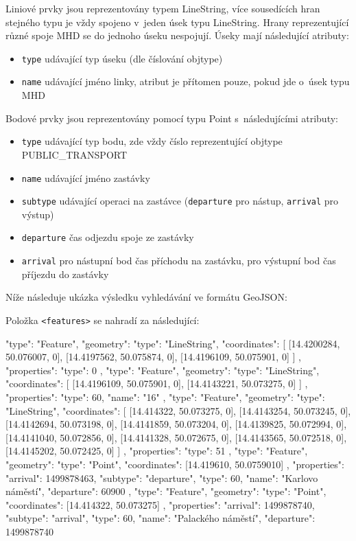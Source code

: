Liniové prvky jsou reprezentovány typem LineString, více sousedících hran
stejného typu je vždy spojeno v~jeden úsek typu LineString. Hrany reprezentující různé
spoje MHD se do jednoho úseku nespojují. Úseky mají následující atributy: 
\begin{itemize}
	\item {\tt type} udávající typ úseku (dle číslování objtype)
	\item {\tt name} udávající jméno linky, atribut je přítomen pouze, pokud
	jde o~úsek typu MHD
\end{itemize}
Bodové prvky jsou reprezentovány pomocí typu Point s~následujícími atributy: 
\begin{itemize}
	\item {\tt type} udávající typ bodu, zde vždy číslo reprezentující objtype PUBLIC\_TRANSPORT  	
	\item {\tt name} udávající jméno zastávky
	\item {\tt subtype} udávající operaci na zastávce ({\tt departure} pro
	nástup, {\tt arrival} pro výstup)
	\item {\tt departure} čas odjezdu spoje ze zastávky
	\item {\tt arrival} pro nástupní bod čas příchodu na zastávku, pro
	výstupní bod čas příjezdu do zastávky
\end{itemize}
Níže následuje ukázka výsledku vyhledávání ve formátu GeoJSON:
\begin{code}
\end{code}

Položka {\tt <features>} se nahradí za následující:
\begin{code}
{
	"type": "Feature",
	"geometry":
	{
		"type": "LineString",
		"coordinates":
		[
			[14.4200284, 50.076007, 0], 
			[14.4197562, 50.075874, 0], 
			[14.4196109, 50.075901, 0]
		]
	}, 
	"properties": {"type": 0}
}, 
{
	"type": "Feature",
	"geometry": 
	{
		"type": "LineString",
		"coordinates":
		[
			[14.4196109, 50.075901, 0],
			[14.4143221, 50.073275, 0]
		]
	},
	"properties": {"type": 60, "name": "16"}
}, {
	"type": "Feature",
	"geometry": 
	{
		"type": "LineString",
		"coordinates":
		[
			[14.414322, 50.073275, 0],
			[14.4143254, 50.073245, 0],
			[14.4142694, 50.073198, 0],
			[14.4141859, 50.073204, 0],
			[14.4139825, 50.072994, 0],
			[14.4141040, 50.072856, 0],
			[14.4141328, 50.072675, 0],
			[14.4143565, 50.072518, 0],
			[14.4145202, 50.072425, 0]
		]
	},
	"properties": {"type": 51}
}, {
	"type": "Feature",
	"geometry":
	{
		"type": "Point", 
		"coordinates": [14.419610, 50.0759010]
	},
	"properties": 
	{
		"arrival": 1499878463, 
		"subtype": "departure", 
		"type": 60, 
		"name": "Karlovo náměstí",
		"departure": 60900
	}
}, {
	"type": "Feature",
	"geometry":
	{
		"type": "Point",
		"coordinates": [14.414322, 50.073275]
	},
	"properties": 
	{
		"arrival": 1499878740,
		"subtype": "arrival",
		"type": 60,
		"name": "Palackého náměstí",
		"departure": 1499878740
	}
}
\end{code}
